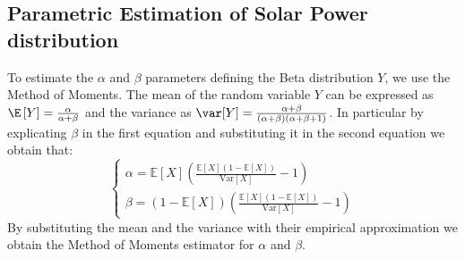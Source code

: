 


\subsection{Parametric Estimation of Solar Power distribution}\label{subsection: beta estim}

To estimate the \(\alpha\) and \(\beta\) parameters defining the Beta distribution \(Y\), we use the Method of Moments.
The mean of the random variable \(Y\) can be expressed as \(\E\left[ Y\right] = \frac{\alpha}{\alpha + \beta} \) and the variance as \(\var [Y]= \frac{\alpha + \beta}{(\alpha + \beta)(\alpha + \beta + 1)}\). 
In particular by explicating \(\beta\) in the first equation and substituting it in the second equation we obtain that:
\begin{equation}
\begin{cases}
\alpha = \mathbb{E}[X] \left( \frac{\mathbb{E}[X](1 - \mathbb{E}[X])}{\mathrm{Var}[X]} - 1 \right) \\
\beta = (1 - \mathbb{E}[X]) \left( \frac{\mathbb{E}[X](1 - \mathbb{E}[X])}{\mathrm{Var}[X]} - 1 \right)
\end{cases}
\end{equation}
By substituting the mean and the variance with their empirical approximation we obtain the Method of Moments estimator for \(\alpha\) and \(\beta\).






